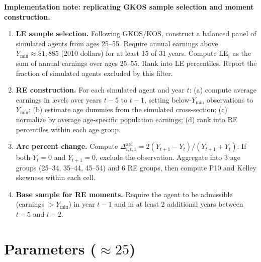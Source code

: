 \documentclass[11pt]{article}
\newcommand{\LE}{\mathrm{LE}}
\begin{document}
\bigskip
\noindent\textbf{Implementation note: replicating GKOS sample selection and moment construction.}
\begin{enumerate}[nosep]
  \item \textbf{LE sample selection.} Following GKOS/KOS, construct a balanced panel of simulated agents from ages 25--55. Require annual earnings above $Y_{\min} \approx \$1{,}885$ (2010 dollars) for at least 15 of 31 years. Compute $\LE_i$ as the sum of annual earnings over ages 25--55. Rank into LE percentiles. Report the fraction of simulated agents excluded by this filter.
  \item \textbf{RE construction.} For each simulated agent and year $t$: (a) compute average earnings in levels over years $t{-}5$ to $t{-}1$, setting below-$Y_{\min}$ observations to $Y_{\min}$; (b) estimate age dummies from the simulated cross-section; (c) normalize by average age-specific population earnings; (d) rank into RE percentiles within each age group.
  \item \textbf{Arc percent change.} Compute $\Delta^{\text{arc}}_{i,t,1} = 2(Y_{t+1} - Y_t)/(Y_{t+1} + Y_t)$. If both $Y_t = 0$ and $Y_{t+1} = 0$, exclude the observation. Aggregate into 3 age groups (25--34, 35--44, 45--54) and 6 RE groups, then compute P10 and Kelley skewness within each cell.
  \item \textbf{Base sample for RE moments.} Require the agent to be admissible (earnings $> Y_{\min}$) in year $t{-}1$ and in at least 2 additional years between $t{-}5$ and $t{-}2$.
\end{enumerate}

\section{Parameters ($\approx 25$)}
\end{document}

